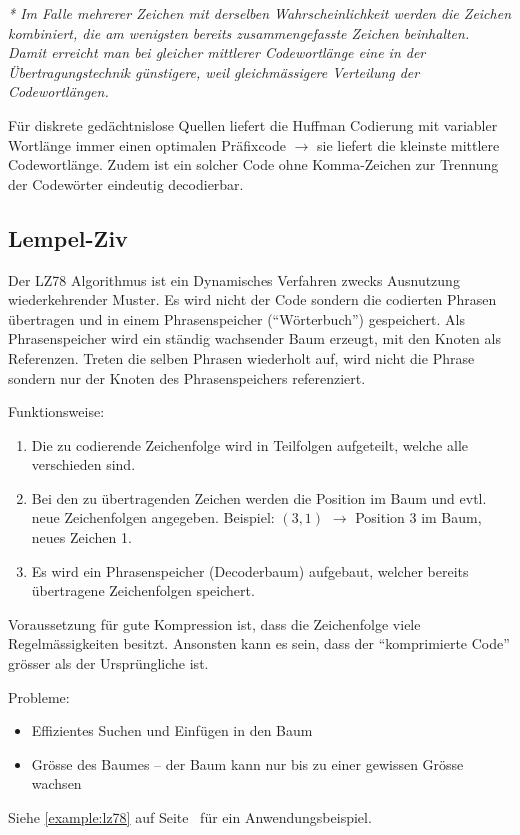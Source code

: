 \textit{* Im Falle mehrerer Zeichen mit derselben Wahrscheinlichkeit werden die
Zeichen kombiniert, die am wenigsten bereits zusammengefasste Zeichen
beinhalten. Damit erreicht man bei gleicher mittlerer Codewortlänge eine in
der Übertragungstechnik günstigere, weil gleichmässigere Verteilung der
Codewortlängen.}

Für diskrete gedächtnislose Quellen liefert die Huffman Codierung mit variabler
Wortlänge immer einen optimalen Präfixcode $\rightarrow$ sie liefert die
kleinste mittlere Codewortlänge. Zudem ist ein solcher Code ohne Komma-Zeichen
zur Trennung der Codewörter eindeutig decodierbar.


\subsection{Lempel-Ziv}

Der LZ78 Algorithmus ist ein Dynamisches Verfahren zwecks Ausnutzung
wiederkehrender Muster. Es wird nicht der Code sondern die codierten Phrasen
übertragen und in einem Phrasenspeicher (``Wörterbuch'') gespeichert. Als
Phrasenspeicher wird ein ständig wachsender Baum erzeugt, mit den Knoten als
Referenzen. Treten die selben Phrasen wiederholt auf, wird nicht die Phrase
sondern nur der Knoten des Phrasenspeichers referenziert.

Funktionsweise:

\begin{enumerate}
	\item Die zu codierende Zeichenfolge wird in Teilfolgen aufgeteilt, welche
		alle verschieden sind.
	\item Bei den zu übertragenden Zeichen werden die Position im Baum und evtl.
		neue Zeichenfolgen angegeben. Beispiel: $(3,1)$ $\rightarrow$ Position 3 im
		Baum, neues Zeichen 1.
	\item Es wird ein Phrasenspeicher (Decoderbaum) aufgebaut, welcher bereits
		übertragene Zeichenfolgen speichert.
\end{enumerate}

Voraussetzung für gute Kompression ist, dass die Zeichenfolge viele
Regelmässigkeiten besitzt. Ansonsten kann es sein, dass der ``komprimierte
Code'' grösser als der Ursprüngliche ist.

Probleme:
\begin{itemize}
	\item Effizientes Suchen und Einfügen in den Baum
	\item Grösse des Baumes -- der Baum kann nur bis zu einer gewissen Grösse wachsen
\end{itemize}

Siehe \autoref{example:lz78} auf Seite~\pageref{example:lz78}
für ein Anwendungsbeispiel.
